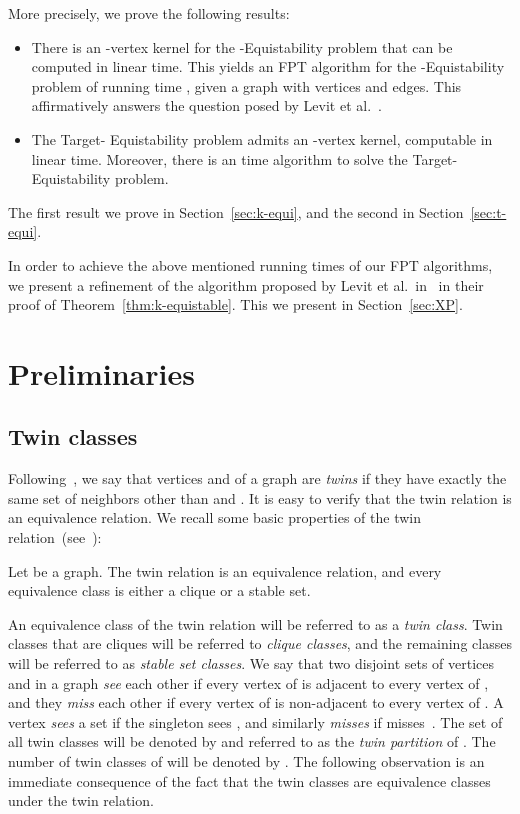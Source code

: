\documentclass{llncs}
\begin{document}
More precisely, we prove the following results:
\begin{itemize}
  \item There is an -vertex kernel for the {\sc -Equistability} problem that can be computed in linear time.
	      This yields an FPT algorithm for the {\sc -Equistability} problem of running time , given a graph with  vertices and  edges. This affirmatively answers the question posed by Levit et al.~\cite{MR3040147}.
  \item The {\sc Target- Equistability} problem admits an -vertex kernel, computable in linear time.
Moreover, there is an  time algorithm to solve the {\sc Target- Equistability} problem.
\end{itemize}
The first result we prove in Section~\ref{sec:k-equi}, and the second in Section~\ref{sec:t-equi}.

In order to achieve the above mentioned running times of our FPT algorithms, we present a refinement of the algorithm proposed
by Levit et al.~in~\cite{MR3040147} in their proof of Theorem~\ref{thm:k-equistable}. This we present in Section~\ref{sec:XP}.

\section{Preliminaries}

\subsection{Twin classes}\label{subsec:twin-classes}

Following~\cite{MR3040147}, we say that vertices  and  of a graph  are {\em twins} if they have exactly the same set of neighbors other
than  and . It is easy to verify that the twin relation is an equivalence relation.
We recall some basic properties of the twin relation~(see~\cite{MR3040147}):

\begin{lemma}
Let  be a graph. The twin relation is an equivalence relation, and every equivalence class is either a clique or a stable set.
\end{lemma}

An equivalence class of the twin relation will be referred to as a {\em twin class}.
Twin classes that are cliques will be referred to {\em clique classes}, and the remaining classes will be referred to as {\em stable set classes}.
We say that two disjoint sets of vertices  and  in a graph  {\em see} each other if every vertex of  is adjacent to every vertex of , and they {\em miss} each other if every vertex of  is non-adjacent to every vertex of . A vertex  {\em sees}
a set  if the singleton  sees , and similarly  {\em misses}  if  misses~.
The set of all twin classes will be denoted by  and referred to as the {\em twin partition} of . The number of twin classes of  will be denoted by . The following observation is an immediate consequence of the fact that the twin classes are equivalence classes under the twin relation.
\end{document}
